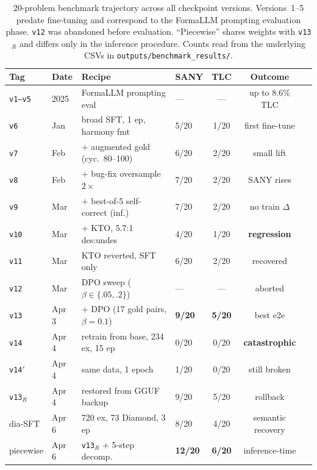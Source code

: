 \documentclass[11pt]{article}
\begin{document}
\begin{table}[t]
\centering
\small
\setlength{\tabcolsep}{4pt}
\begin{tabular}{@{}llllccl@{}}
\toprule
Tag & Date & Recipe & SANY & TLC & Outcome \\
\midrule
\texttt{v1--v5} & 2025 & FormaLLM prompting eval
  & --- & --- & up to 8.6\% TLC \\
\texttt{v6}  & Jan & broad SFT, 1 ep, harmony fmt
  & 5/20 & 1/20 & first fine-tune \\
\texttt{v7}  & Feb & $+$ augmented gold (cyc.\ 80--100)
  & 6/20 & 2/20 & small lift \\
\texttt{v8}  & Feb & $+$ bug-fix oversample $2\times$
  & 7/20 & 2/20 & SANY rises \\
\texttt{v9}  & Mar & $+$ best-of-5 self-correct (inf.)
  & 7/20 & 2/20 & no train $\Delta$ \\
\texttt{v10} & Mar & $+$ KTO, 5.7:1 des:undes
  & 4/20 & 1/20 & \textbf{regression} \\
\texttt{v11} & Mar & KTO reverted, SFT only
  & 6/20 & 2/20 & recovered \\
\texttt{v12} & Mar & DPO sweep ($\beta\!\in\!\{.05,.2\}$)
  & ---  & ---  & aborted \\
\texttt{v13} & Apr 3 & $+$ DPO (17 gold pairs, $\beta\!=\!0.1$)
  & \textbf{9/20} & \textbf{5/20} & best e2e \\
\texttt{v14} & Apr 4 & retrain from base, 234 ex, 15 ep
  & 0/20 & 0/20 & \textbf{catastrophic} \\
\texttt{v14}$'$ & Apr 4 & same data, 1 epoch
  & 1/20 & 0/20 & still broken \\
\texttt{v13}$_R$ & Apr 4 & restored from GGUF backup
  & 9/20 & 5/20 & rollback \\
\midrule
dia-SFT   & Apr 6 & 720 ex, 73 Diamond, 3 ep
  & 8/20 & 4/20 & semantic recovery \\
piecewise & Apr 6 & \texttt{v13}$_R$ $+$ 5-step decomp.
  & \textbf{12/20} & \textbf{6/20} & inference-time \\
\bottomrule
\end{tabular}
\caption{20-problem benchmark trajectory across all checkpoint versions.
Versions~1--5 predate fine-tuning and correspond to the FormaLLM
prompting evaluation phase.  \texttt{v12} was abandoned before
evaluation.  ``Piecewise'' shares weights with \texttt{v13}$_R$ and
differs only in the inference procedure.  Counts read from the
underlying CSVs in \texttt{outputs/benchmark\_results/}.}
\label{tab:run-history}
\end{table}
\end{document}
